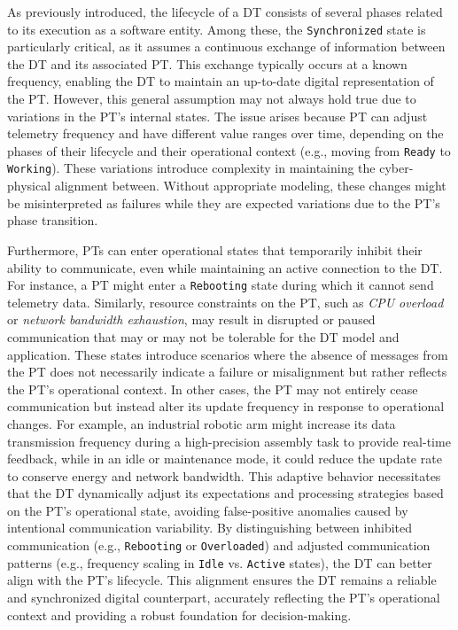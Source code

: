 As previously introduced, the lifecycle of a DT consists of several phases related to its execution as a software entity.
Among these, the \texttt{Synchronized} state is particularly critical, as it assumes a continuous exchange of information between the DT and its associated PT.
This exchange typically occurs at a known frequency, enabling the DT to maintain an up-to-date digital representation of the PT.
However, this general assumption may not always hold true due to variations in the PT's internal states.
The issue arises because PT can adjust telemetry frequency and have different value ranges over time, depending on the phases of their lifecycle and their operational context (e.g., moving from \texttt{Ready} to \texttt{Working}).
These variations introduce complexity in maintaining the cyber-physical alignment between. Without appropriate modeling, these changes might be misinterpreted as failures while they are expected variations due to the PT's phase transition.

Furthermore, PTs can enter operational states that temporarily inhibit their ability to communicate, even while maintaining an active connection to the DT. For instance, a PT might enter a \texttt{Rebooting} state during which it cannot send telemetry data.
Similarly, resource constraints on the PT, such as \textit{CPU overload} or \textit{network bandwidth exhaustion}, may result in disrupted or paused communication that may or may not be tolerable for the DT model and application.
These states introduce scenarios where the absence of messages from the PT does not necessarily indicate a failure or misalignment but rather reflects the PT's operational context. 
In other cases, the PT may not entirely cease communication but instead alter its update frequency in response to operational changes. For example, an industrial robotic arm might increase its data transmission frequency during a high-precision assembly task to provide real-time feedback, while in an idle or maintenance mode, it could reduce the update rate to conserve energy and network bandwidth.
This adaptive behavior necessitates that the DT dynamically adjust its expectations and processing strategies based on the PT's operational state, avoiding false-positive anomalies caused by intentional communication variability.  
By distinguishing between inhibited communication (e.g., \texttt{Rebooting} or \texttt{Overloaded}) and adjusted communication patterns (e.g., frequency scaling in \texttt{Idle} vs. \texttt{Active} states), the DT can better align with the PT's lifecycle. This alignment ensures the DT remains a reliable and synchronized digital counterpart, accurately reflecting the PT's operational context and providing a robust foundation for decision-making.  

